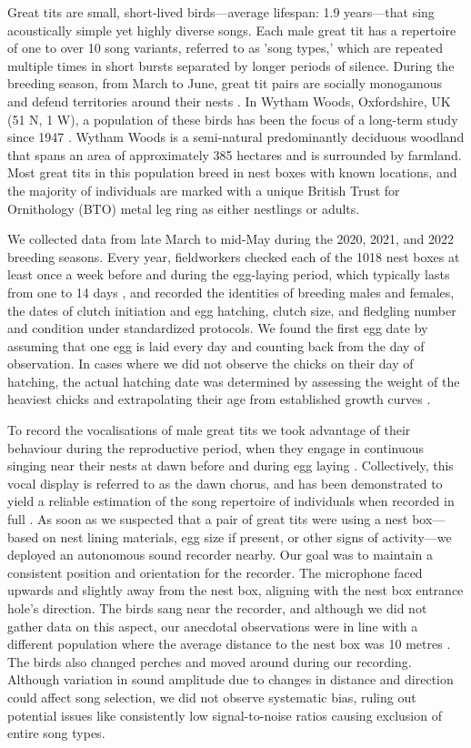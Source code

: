 Great tits are small, short-lived birds---average lifespan: 1.9 years---that sing acoustically simple yet highly diverse songs. Each male great tit has a repertoire of one to over 10 song variants, referred to as 'song types,' which are repeated multiple times in short bursts separated by longer periods of silence. During the breeding season, from March to June, great tit pairs are socially monogamous and defend territories around their nests \parencite{hinde1952}. In Wytham Woods, Oxfordshire, UK (51 N, 1 W), a population of these birds has been the focus of a long-term study since 1947 \parencite{lack1964}. Wytham Woods is a semi-natural predominantly deciduous woodland that spans an area of approximately 385 hectares and is surrounded by farmland. Most great tits in this population breed in nest boxes with known locations, and the majority of individuals are marked with a unique British Trust for Ornithology (BTO) metal leg ring as either nestlings or adults.

We collected data from late March to mid-May during the 2020, 2021, and 2022 breeding seasons. Every year, fieldworkers checked each of the 1018 nest boxes at least once a week before and during the egg-laying period, which typically lasts from one to 14 days \parencite{Perrins1965}, and recorded the identities of breeding males and females, the dates of clutch initiation and egg hatching, clutch size, and fledgling number and condition under standardized protocols. We found the first egg date by assuming that one egg is laid every day and counting back from the day of observation. In cases where we did not observe the chicks on their day of hatching, the actual hatching date was determined by assessing the weight of the heaviest chicks and extrapolating their age from established growth curves \parencite{cresswell2003, gibb1950}.

To record the vocalisations of male great tits we took advantage of their behaviour during the reproductive period, when they engage in continuous singing near their nests at dawn before and during egg laying \parencite{mace1987}. Collectively, this vocal display is referred to as the dawn chorus, and has been demonstrated to yield a reliable estimation of the song repertoire of individuals when recorded in full \parencite{rivera-gutierrez2012, vanduyse2005}. As soon as we suspected that a pair of great tits were using a nest box---based on nest lining materials, egg size if present, or other signs of activity---we deployed an autonomous sound recorder nearby. Our goal was to maintain a consistent position and orientation for the recorder. The microphone faced upwards and slightly away from the nest box, aligning with the nest box entrance hole's direction. The birds sang near the recorder, and although we did not gather data on this aspect, our anecdotal observations were in line with a different population where the average distance to the nest box was 10 metres \parencite{halfwerk2012}. The birds also changed perches and moved around during our recording. Although variation in sound amplitude due to changes in distance and direction could affect song selection, we did not observe systematic bias, ruling out potential issues like consistently low signal-to-noise ratios causing exclusion of entire song types.


